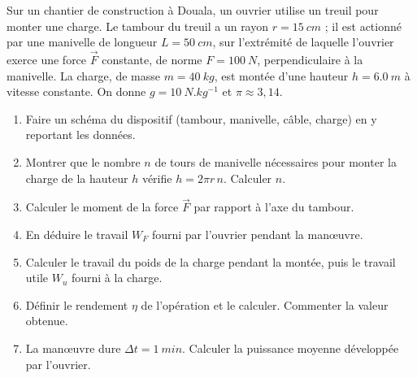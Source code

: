 \documentclass[11pt]{article}
\begin{document}
\begin{exercice}
Sur un chantier de construction à Douala, un ouvrier utilise un treuil pour monter une charge. Le tambour du treuil a un rayon $r = \SI{15}{cm}$ ; il est actionné par une manivelle de longueur $L = \SI{50}{cm}$, sur l'extrémité de laquelle l'ouvrier exerce une force $\vec{F}$ constante, de norme $F = \SI{100}{N}$, perpendiculaire à la manivelle. La charge, de masse $m = \SI{40}{kg}$, est montée d'une hauteur $h = \SI{6,0}{m}$ à vitesse constante. On donne $g = \SI{10}{N.kg^{-1}}$ et $\pi \approx 3,14$.
\begin{enumerate}
\item Faire un schéma du dispositif (tambour, manivelle, câble, charge) en y reportant les données.
\item Montrer que le nombre $n$ de tours de manivelle nécessaires pour monter la charge de la hauteur $h$ vérifie $h = 2\pi r\, n$. Calculer $n$.
\item Calculer le moment de la force $\vec{F}$ par rapport à l'axe du tambour.
\item En déduire le travail $W_F$ fourni par l'ouvrier pendant la manœuvre.
\item Calculer le travail du poids de la charge pendant la montée, puis le travail utile $W_u$ fourni à la charge.
\item Définir le rendement $\eta$ de l'opération et le calculer. Commenter la valeur obtenue.
\item La manœuvre dure $\Delta t = \SI{1}{min}$. Calculer la puissance moyenne développée par l'ouvrier.
\end{enumerate}
\end{exercice}
\end{document}
